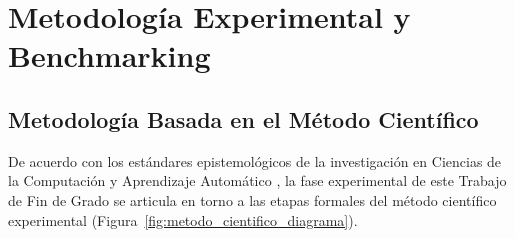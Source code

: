 
\chapter{Metodología Experimental y Benchmarking}
\label{cap:experimentacion}

\section{Metodología Basada en el Método Científico}
\label{sec:exp_metodo}

De acuerdo con los estándares epistemológicos de la investigación en Ciencias de la Computación y Aprendizaje Automático \cite{chalmers2013what, guillen2025libro}, la fase experimental de este Trabajo de Fin de Grado se articula en torno a las etapas formales del método científico experimental (Figura~\ref{fig:metodo_cientifico_diagrama}).

